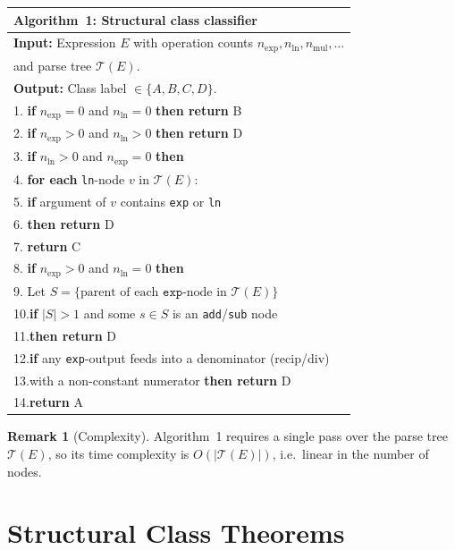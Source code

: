 \documentclass[12pt,a4paper]{article}
\theoremstyle{definition}
\newtheorem{remark}[theorem]{Remark}
\begin{document}
\begin{center}
\begin{tabular}{@{}l@{}}
\hline
\textbf{Algorithm~1}: Structural class classifier \\
\hline
\textbf{Input:} Expression $E$ with operation counts
  $n_{\exp}, n_{\ln}, n_{\mathrm{mul}}, \ldots$ \\
\quad and parse tree $\mathcal{T}(E)$. \\
\textbf{Output:} Class label $\in \{A, B, C, D\}$. \\[4pt]
1. \textbf{if} $n_{\exp} = 0$ and $n_{\ln} = 0$ \textbf{then return} B \\
2. \textbf{if} $n_{\exp} > 0$ and $n_{\ln} > 0$ \textbf{then return} D \\
3. \textbf{if} $n_{\ln} > 0$ and $n_{\exp} = 0$ \textbf{then} \\
4. \quad \textbf{for each} \texttt{ln}-node $v$ in $\mathcal{T}(E)$: \\
5. \quad\quad \textbf{if} argument of $v$ contains \texttt{exp} or \texttt{ln} \\
6. \quad\quad \textbf{then return} D \\
7. \quad \textbf{return} C \\
8. \textbf{if} $n_{\exp} > 0$ and $n_{\ln} = 0$ \textbf{then} \\
9. \quad Let $S = \{\text{parent of each } \texttt{exp}\text{-node in } \mathcal{T}(E)\}$ \\
10.\quad \textbf{if} $|S| > 1$ and some $s \in S$ is an \texttt{add}/\texttt{sub} node \\
11.\quad \textbf{then return} D \\
12.\quad \textbf{if} any \texttt{exp}-output feeds into a denominator (recip/div) \\
13.\quad \quad with a non-constant numerator \textbf{then return} D \\
14.\quad \textbf{return} A \\
\hline
\end{tabular}
\end{center}

\begin{remark}[Complexity]
Algorithm~1 requires a single pass over the parse tree $\mathcal{T}(E)$,
so its time complexity is $O(|\mathcal{T}(E)|)$, i.e.\ linear in the
number of nodes.
\end{remark}

\section{Structural Class Theorems}
\label{sec:theorems}
\end{document}

